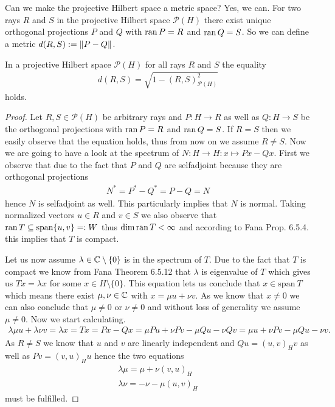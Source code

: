 Can we make the projective Hilbert space a metric space? Yes, we can. For two rays $R$ and $S$ in the projective Hilbert space $\mathcal{P}(H)$ there exist unique orthogonal projections $P$ and $Q$ with $\operatorname{ran} P = R$ and $\operatorname{ran} Q = S$. So we can define a metric $d(R,S) := {\left \| P - Q \right \|}_{}$.



\begin{lemma} \label{lemma:metric_representation}
	In a projective Hilbert space $\mathcal{P}(H)$ for all rays $R$ and $S$ the equality 
	\begin{align*}
		d(R,S) = \sqrt{1 - (R,S)_{\mathcal{P}(H)}^2}
	\end{align*}
	holds.
\end{lemma}

\begin{proof}
	Let $R,S \in\mathcal{P}(H)$ be arbitrary rays and $P: H \to R$ as well as $Q: H \to S$ be the orthogonal projections with $\operatorname{ran} P = R$ and $\operatorname{ran} Q = S$. If $R = S$ then we easily observe that the equation holds, thus from now on we assume $R \neq S$. Now we are going to have a look at the spectrum of $N: H \to H: x  \mapsto Px - Qx$. First we observe that due to the fact that $P$ and $Q$ are selfadjoint because they are orthogonal projections
	\begin{align*}
		N^\ast = P^\ast - Q^\ast = P - Q = N
	\end{align*}
	hence $N$ is selfadjoint as well. This particularly implies that $N$ is normal. Taking normalized vectors $u \in R$ and $v \in S$ we also observe that $\operatorname{ran} T \subseteq \mathrm{span}\{u, v\} =: W$ thus $\dim \operatorname{ran} T < \infty$ and according to Fana Prop. 6.5.4. this implies that $T$ is compact.
	
	Let us now assume $\lambda \in \mathbb{C} \setminus \{0\}$ is in the spectrum of $T$. Due to the fact that $T$ is compact we know from Fana Theorem 6.5.12 that $\lambda$ is eigenvalue of $T$ which gives us $T x = \lambda x$ for some $x \in H \setminus \{0\}$. This equation lets us conclude that $x \in \mathrm{span 
	}\ T$ which means there exist $\mu, \nu \in \mathbb{C}$ with $x = \mu u + \nu v$. As we know that $x \neq 0$ we can also conclude that $\mu \neq 0$ or $\nu \neq 0$ and without loss of generality we assume $\mu \neq 0$. Now we start calculating.
	\begin{align*}
		\lambda \mu u + \lambda \nu v = \lambda x = Tx = Px - Qx = \mu Pu + \nu Pv - \mu Qu - \nu Qv = \mu u + \nu Pv - \mu Qu - \nu v .
	\end{align*}
	As $R \neq S$ we know that $u$ and $v$ are linearly independent and $Qu = (u,v)_H v$ as well as $Pv = (v,u)_H u$ hence the two equations
	\begin{align}
		\lambda \mu  = \mu  + \nu (v,u)_H \label{eq:metric1}\\
		 \lambda \nu  = - \nu  - \mu (u,v)_H \label{eq:metric2}
	\end{align}
	must be fulfilled. 
	

\end{proof}
